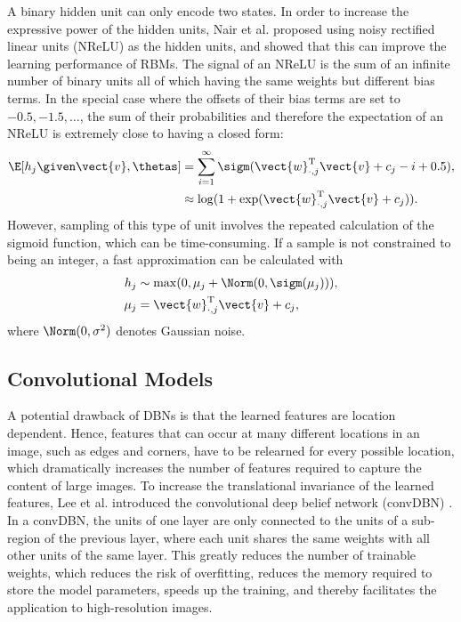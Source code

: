 A binary hidden unit can only encode two states. In order to increase the
expressive power of the hidden units, Nair et al. proposed using noisy rectified
linear units (NReLU) \citep{nair2010} as the hidden units, and showed that this
can improve the learning performance of RBMs. The signal of an NReLU is the sum
of an infinite number of binary units all of which having the same weights but
different bias terms. In the special case where the offsets of their bias
terms are set to $-0.5, -1.5, \dotsc$, the sum of their probabilities and
therefore the expectation of an NReLU is extremely close to having a closed form:
\begin{align}
\E[h_j \given \vect{v}, \thetas] &=
\sum_{i=1}^\infty \sigm(\vect{w}_{\cdot,j}^\text{T}\vect{v} + c_j - i + 0.5),\\
&\approx \log(1+\exp(\vect{w}_{\cdot,j}^\text{T}\vect{v} + c_j)).
\end{align}
However, sampling of this type of unit involves the repeated calculation of the
sigmoid function, which can be time-consuming. If a sample is not constrained
to being an integer, a fast approximation can be calculated with
\begin{align} 
h_j &\sim \max(0, \mu_j + \Norm(0, \sigm(\mu_j))), \\
\mu_j &= \vect{w}_{\cdot,j}^\text{T}\vect{v} + c_j,
\end{align}
where $\Norm(0, \sigma^2)$ denotes Gaussian noise.

\subsection{Convolutional Models}

A potential drawback of DBNs is that the learned features are location
dependent. Hence, features that can occur at many different locations in an
image, such as edges and corners, have to be relearned for every possible
location, which dramatically increases the number of features required to
capture the content of large images. To increase the translational invariance of
the learned features, Lee et al. introduced the convolutional deep belief
network (convDBN) \citep{lee2009,lee2011}. In a convDBN, the units of one layer
are only connected to the units of a sub-region of the previous layer, where
each unit shares the same weights with all other units of the same layer. This
greatly reduces the number of trainable weights, which reduces the risk of
overfitting, reduces the memory required to store the model parameters, speeds
up the training, and thereby facilitates the application to high-resolution
images.

